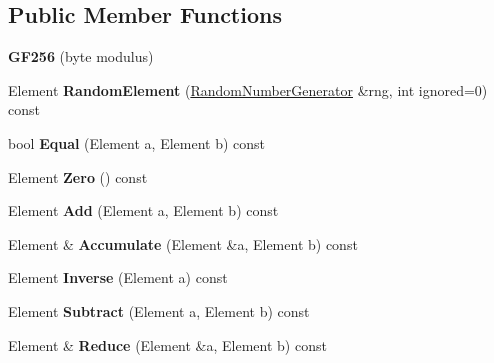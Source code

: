\subsection*{Public Member Functions}
\begin{DoxyCompactItemize}
\item 
\hypertarget{class_g_f256_a05c5c0fe21f384cf01e8e256a7bf77ff}{
{\bfseries GF256} (byte modulus)}
\label{class_g_f256_a05c5c0fe21f384cf01e8e256a7bf77ff}

\item 
\hypertarget{class_g_f256_a2881cb3770c02bb409f501b7a3a9fa42}{
Element {\bfseries RandomElement} (\hyperlink{class_random_number_generator}{RandomNumberGenerator} \&rng, int ignored=0) const }
\label{class_g_f256_a2881cb3770c02bb409f501b7a3a9fa42}

\item 
\hypertarget{class_g_f256_a6812749905cd3ac86fd569623a05a743}{
bool {\bfseries Equal} (Element a, Element b) const }
\label{class_g_f256_a6812749905cd3ac86fd569623a05a743}

\item 
\hypertarget{class_g_f256_a4f1d329dbd7b129fbee4939e466dff67}{
Element {\bfseries Zero} () const }
\label{class_g_f256_a4f1d329dbd7b129fbee4939e466dff67}

\item 
\hypertarget{class_g_f256_a284190fc82aac6d40f9a061d06f797ac}{
Element {\bfseries Add} (Element a, Element b) const }
\label{class_g_f256_a284190fc82aac6d40f9a061d06f797ac}

\item 
\hypertarget{class_g_f256_a0e88cddbf2ebe56de9ce9f0fb8df34fd}{
Element \& {\bfseries Accumulate} (Element \&a, Element b) const }
\label{class_g_f256_a0e88cddbf2ebe56de9ce9f0fb8df34fd}

\item 
\hypertarget{class_g_f256_a8a7d82595f3601d04df3693e3783f511}{
Element {\bfseries Inverse} (Element a) const }
\label{class_g_f256_a8a7d82595f3601d04df3693e3783f511}

\item 
\hypertarget{class_g_f256_abc7d41a6cb489c2739f457793a6a7e90}{
Element {\bfseries Subtract} (Element a, Element b) const }
\label{class_g_f256_abc7d41a6cb489c2739f457793a6a7e90}

\item 
\hypertarget{class_g_f256_a7d2ead8ad5ba70a71d0fe75bae4b31f9}{
Element \& {\bfseries Reduce} (Element \&a, Element b) const }
\label{class_g_f256_a7d2ead8ad5ba70a71d0fe75bae4b31f9}


\end{DoxyCompactItemize}
